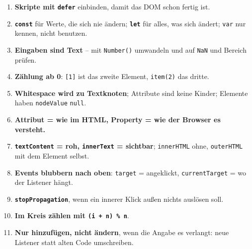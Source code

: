 \documentclass[a4paper,11pt]{article}
\begin{document}
\begin{merkbox}[title={Goldene Regeln}]
\begin{enumerate}[nosep]
\item \textbf{Skripte mit \texttt{defer}} einbinden, damit das DOM schon fertig ist.
\item \textbf{\texttt{const}} für Werte, die sich nie ändern; \textbf{\texttt{let}} für alles, was sich ändert;
      \texttt{var} nur kennen, nicht benutzen.
\item \textbf{Eingaben sind Text} -- mit \texttt{Number()} umwandeln und auf \texttt{NaN} und Bereich prüfen.
\item \textbf{Zählung ab 0}: \texttt{[1]} ist das zweite Element, \texttt{item(2)} das dritte.
\item \textbf{Whitespace wird zu Textknoten}; Attribute sind keine Kinder; Elemente haben \texttt{nodeValue} \texttt{null}.
\item \textbf{Attribut = wie im HTML, Property = wie der Browser es versteht.}
\item \textbf{\texttt{textContent} = roh, \texttt{innerText} = sichtbar}; \texttt{innerHTML} ohne, \texttt{outerHTML} mit dem Element selbst.
\item \textbf{Events blubbern nach oben}: \texttt{target} = angeklickt, \texttt{currentTarget} = wo der Listener hängt.
\item \textbf{\texttt{stopPropagation}}, wenn ein innerer Klick außen nichts auslösen soll.
\item \textbf{Im Kreis zählen mit \texttt{(i + n) \% n}}.
\item \textbf{Nur hinzufügen, nicht ändern}, wenn die Angabe es verlangt: neue Listener statt alten Code umschreiben.
\end{enumerate}
\end{merkbox}
\end{document}
